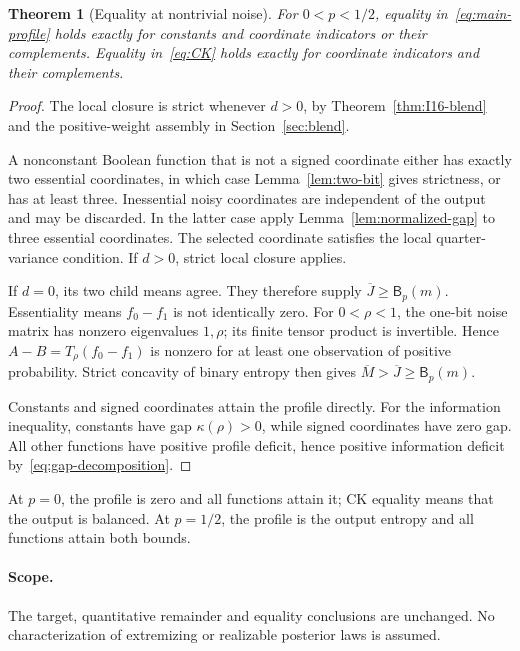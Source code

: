 \documentclass[11pt]{article}
\newtheorem{theorem}{Theorem}[section]
\theoremstyle{remark}\newtheorem{remark}[theorem]{Remark}
\newcommand{\Bprof}{\mathsf B_p}\newcommand{\Pprof}{\Phi_p}
\numberwithin{equation}{section}
\begin{document}
\begin{theorem}[Equality at nontrivial noise]\label{thm:equality}
For $0<p<1/2$, equality in~\eqref{eq:main-profile} holds exactly for constants and coordinate indicators or their complements. Equality in~\eqref{eq:CK} holds exactly for coordinate indicators and their complements.
\end{theorem}
\begin{proof}
The local closure is strict whenever $d>0$, by Theorem~\ref{thm:I16-blend} and the positive-weight assembly in Section~\ref{sec:blend}.

A nonconstant Boolean function that is not a signed coordinate either
has exactly two essential coordinates, in which case Lemma~\ref{lem:two-bit}
gives strictness, or has at least three. Inessential noisy coordinates are
independent of the output and may be discarded. In the latter case apply
Lemma~\ref{lem:normalized-gap} to three essential coordinates. The selected
coordinate satisfies the local quarter-variance condition. If $d>0$, strict local
closure applies.

If $d=0$, its two child means agree. They therefore supply $\overline J\ge\Bprof(m)$. Essentiality means $f_0-f_1$ is not identically zero. For $0<\rho<1$, the one-bit noise matrix has nonzero eigenvalues $1,\rho$; its finite tensor product is invertible. Hence $A-B=T_\rho(f_0-f_1)$ is nonzero for at least one observation of positive probability. Strict concavity of binary entropy then gives $\overline M>\overline J\ge\Bprof(m)$.

Constants and signed coordinates attain the profile directly. For the information inequality, constants have gap $\kappa(\rho)>0$, while signed coordinates have zero gap. All other functions have positive profile deficit, hence positive information deficit by~\eqref{eq:gap-decomposition}.
\end{proof}
At $p=0$, the profile is zero and all functions attain it; CK equality means that the output is balanced. At $p=1/2$, the profile is the output entropy and all functions attain both bounds.


\paragraph{Scope.}
The target, quantitative remainder and equality conclusions are unchanged.
No characterization of extremizing or realizable posterior laws is assumed.

\appendix
\end{document}
